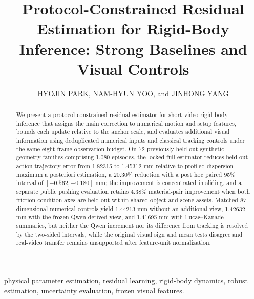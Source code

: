 \documentclass{ieeeaccess}
\begin{document}
\history{}
\doi{}
\title{Protocol-Constrained Residual Estimation for Rigid-Body Inference: Strong Baselines and Visual Controls}
\author{\uppercase{Hyojin Park}, \uppercase{Nam-Hyun Yoo}, and \uppercase{Jinhong Yang}}
\address[1]{Gyeongnam Intelligence Innovation Center (GIIC), Kyungnam University, 7, Gyeongnamdaehak-ro, Masanhappo-gu, Changwon 51767, Republic of Korea}
\address[2]{Computer Engineering, Kyungnam University, Changwon 51767, Republic of Korea}
\address[3]{Department of Medical Information Technology, Inje University, Gimhae 50834, Republic of Korea}
\tfootnote{}
\begin{abstract}
We present a protocol-constrained residual estimator for short-video rigid-body inference that assigns the main correction to numerical motion and setup features, bounds each update relative to the anchor scale, and evaluates additional visual information using deduplicated numerical inputs and classical tracking controls under the same eight-frame observation budget.
On 72 previously held-out synthetic geometry families comprising 1,080 episodes, the locked full estimator reduces held-out-action trajectory error from 1.82315 to 1.45312 mm relative to profiled-dispersion maximum a posteriori estimation, a 20.30\% reduction with a post hoc paired 95\% interval of $[-0.562,-0.180]$ mm; the improvement is concentrated in sliding, and a separate public pushing evaluation retains 4.38\% material-pair improvement when both friction-condition axes are held out within shared object and scene assets.
Matched 87-dimensional numerical controls yield 1.44213 mm without an additional view, 1.42632 mm with the frozen Qwen-derived view, and 1.41695 mm with Lucas--Kanade summaries, but neither the Qwen increment nor its difference from tracking is resolved by the two-sided intervals, while the original visual sign and mean tests disagree and real-video transfer remains unsupported after feature-unit normalization.
\end{abstract}
\begin{keywords}
physical parameter estimation, residual learning, rigid-body dynamics, robust estimation, uncertainty evaluation, frozen visual features.
\end{keywords}
\titlepgskip=-15pt
\maketitle
\end{document}
